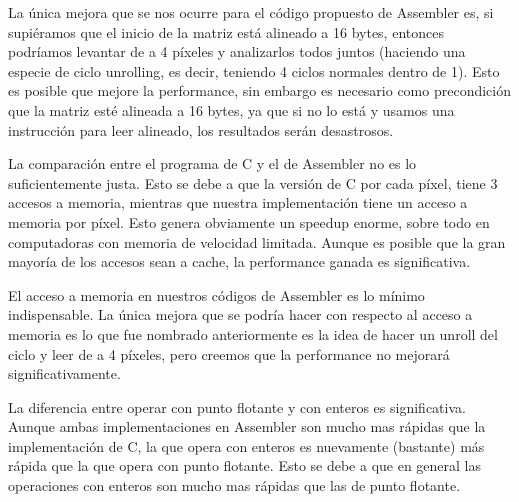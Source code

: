 La única mejora que se nos ocurre para el código propuesto de Assembler es, si supiéramos que el inicio de la matriz está alineado a 16 bytes, entonces podríamos levantar de a 4 píxeles y analizarlos todos juntos (haciendo una especie de ciclo unrolling, es decir, teniendo 4 ciclos normales dentro de 1).
Esto es posible que mejore la performance, sin embargo es necesario como precondición que la matriz esté alineada a 16 bytes, ya que si no lo está y usamos una instrucción para leer alineado, los resultados serán desastrosos.

La comparación entre el programa de C y el de Assembler no es lo suficientemente justa. Esto se debe a que la versión de C por cada píxel, tiene 3 accesos a memoria, mientras que nuestra implementación tiene un acceso a memoria por píxel. Esto genera obviamente un speedup enorme, sobre todo en computadoras con memoria de velocidad limitada.
Aunque es posible que la gran mayoría de los accesos sean a cache, la performance ganada es significativa.

El acceso a memoria en nuestros códigos de Assembler es lo mínimo indispensable. La única mejora que se podría hacer con respecto al acceso a memoria es lo que fue nombrado anteriormente es la idea de hacer un unroll del ciclo y leer de a 4 píxeles, pero creemos que la performance no mejorará significativamente.

La diferencia entre operar con punto flotante y con enteros es significativa. Aunque ambas implementaciones en Assembler son mucho mas rápidas que la implementación de C, la que opera con enteros es nuevamente (bastante) más rápida que la que opera con punto flotante. Esto se debe a que en general las operaciones con enteros son mucho mas rápidas que las de punto flotante.
